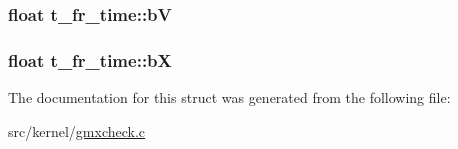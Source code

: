 \hypertarget{structt__fr__time_a9f167a43051024761f6ccd87321f95de}{
\subsubsection[{b\-V}]{\setlength{\rightskip}{0pt plus 5cm}float {\bf t\-\_\-fr\-\_\-time\-::b\-V}}}\label{structt__fr__time_a9f167a43051024761f6ccd87321f95de}
\hypertarget{structt__fr__time_afd6e2805a976f95f7b98a898f034a327}{
\subsubsection[{b\-X}]{\setlength{\rightskip}{0pt plus 5cm}float {\bf t\-\_\-fr\-\_\-time\-::b\-X}}}\label{structt__fr__time_afd6e2805a976f95f7b98a898f034a327}


\-The documentation for this struct was generated from the following file\-:\begin{DoxyCompactItemize}
\item 
src/kernel/\hyperlink{gmxcheck_8c}{gmxcheck.\-c}\end{DoxyCompactItemize}
